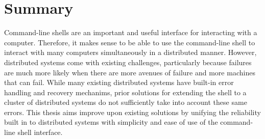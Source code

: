 \documentclass[twoside]{report}
\begin{document}
\section{Summary}
Command-line shells are an important and useful interface for interacting with a computer.
Therefore, it makes sense to be able to use the command-line shell to interact with many computers simultaneously in a distributed manner.
However, distributed systems come with existing challenges, particularly because failures are much more likely when there are more avenues of failure and more machines that can fail.
While many existing distributed systems have built-in error handling and recovery mechanims, prior solutions for extending the shell to a cluster of distributed systems do not sufficiently take into account these same errors.
This thesis aims improve upon existing solutions by unifying the reliability built in to distributed systems with simplicity and ease of use of the command-line shell interface.



\end{document}
